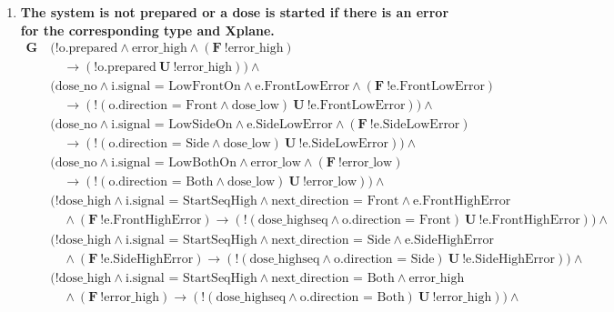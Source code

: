 \documentclass[a4paper,10pt]{article}
\newcommand{\LTLG}{\mathbf{G~}}
\newcommand{\LTLF}{\mathbf{F~}}
\newcommand{\LTLU}{\mathbf{~U~}}
\newcommand{\imply}{\rightarrow}
\newcommand{\doselow}{\textrm{dose\_low}}
\newcommand{\doseno}{\textrm{dose\_no}}
\newcommand{\dosehigh}{\textrm{dose\_high}}
\newcommand{\dosehighseq}{\textrm{dose\_highseq}}
\newcommand{\errorlow}{\textrm{error\_low}}
\newcommand{\errorhigh}{\textrm{error\_high}}
\begin{document}
\begin{enumerate}
		\item \textbf{The system is not prepared or a dose is started if there is an error for the corresponding type and Xplane.}
			\begin{align*}
				\LTLG &(!\textrm{o.prepared} \land \errorhigh \land (\LTLF !\errorhigh) \\
				&\hspace{1em}	\imply (!\textrm{o.prepared} \LTLU !\errorhigh)) \land \\
				& (\doseno \land \textrm{i.signal = LowFrontOn} \land \textrm{e.FrontLowError} \land (\LTLF !\textrm{e.FrontLowError}) \\
				&\hspace{1em}	\imply (!(\textrm{o.direction = Front} \land \doselow) \LTLU !\textrm{e.FrontLowError})) \land \\
				& (\doseno \land \textrm{i.signal = LowSideOn} \land \textrm{e.SideLowError} \land (\LTLF !\textrm{e.SideLowError}) \\
				&\hspace{1em}	\imply (!(\textrm{o.direction = Side} \land \doselow) \LTLU !\textrm{e.SideLowError})) \land \\
				& (\doseno \land \textrm{i.signal = LowBothOn} \land \errorlow \land (\LTLF !\errorlow) \\
				&\hspace{1em}	\imply (!(\textrm{o.direction = Both} \land \doselow) \LTLU !\errorlow)) \land \\
				& (!\dosehigh \land \textrm{i.signal = StartSeqHigh} \land \textrm{next\_direction = Front} \land \textrm{e.FrontHighError} \\
				&\hspace{1em}	\land (\LTLF !\textrm{e.FrontHighError}) \imply (!(\dosehighseq \land \textrm{o.direction = Front}) \LTLU !\textrm{e.FrontHighError})) \land \\
				& (!\dosehigh \land \textrm{i.signal = StartSeqHigh} \land \textrm{next\_direction = Side} \land \textrm{e.SideHighError}\\
				&\hspace{1em}	\land (\LTLF !\textrm{e.SideHighError}) \imply (!(\dosehighseq \land \textrm{o.direction = Side}) \LTLU !\textrm{e.SideHighError})) \land \\
				& (!\dosehigh \land \textrm{i.signal = StartSeqHigh} \land \textrm{next\_direction = Both} \land \errorhigh \\
				&\hspace{1em}	\land (\LTLF !\errorhigh) \imply (!(\dosehighseq \land \textrm{o.direction = Both}) \LTLU !\errorhigh)) \land \\

\end{align*}
\end{enumerate}
\end{document}

